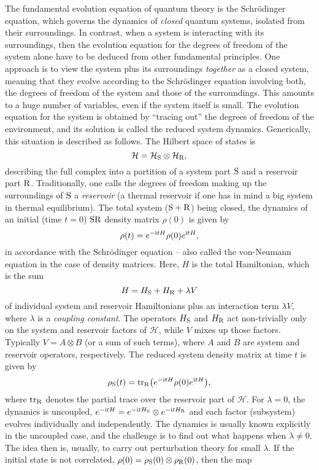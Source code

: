 \documentclass[letterpaper,onecolumn,11pt,accepted=2021-12-09]{quantumarticle}
\numberwithin{equation}{section}
\renewcommand{\r}{{\rm R}}
\newcommand{\s}{{\rm S}}
\renewcommand{\i}{{\rm i}}
\begin{document}
The fundamental evolution equation of quantum theory is the Schr\"odinger equation, which governs the dynamics of {\em closed} quantum systems,  isolated from their surroundings. In contrast, when a system is interacting with its surroundings, then the evolution equation for the degrees of freedom of the system alone have to be deduced from other fundamental principles. One approach is to view the system plus its surroundings {\em together} as a closed system, meaning that they evolve according to the Schr\"odinger equation involving both, the degrees of freedom of the system and those of the surroundings. This amounts to a huge number of variables, even if the system itself is small. The evolution equation for the system is obtained by ``tracing out'' the degrees of freedom of the environment, and its solution is called the reduced system dynamics. Generically, this situation is described as follows. The Hilbert space of states is 
\begin{equation}
\label{i4}
{\mathcal H}={\mathcal H}_\s\otimes{\mathcal H}_\r,
\end{equation}
describing the full complex into a partition of a system part $\s$ and a reservoir part $\r$. Traditionally, one calls the degrees of freedom making up the surroundings of $\s$ a {\em reservoir} (a thermal reservoir if one has in mind a big system in thermal equilibrium). The total system ($\s+\r$) being closed, the dynamics of an initial (time $t=0$) $\s\r$ density matrix $\rho(0)$ is given by 
$$
\rho(t) = e^{-\i t H}\rho(0) e^{\i t H},
$$
in accordance with the Schr\"odinger equation -- also called the von-Neumann equation in the case of density matrices. Here, $H$ is the total Hamiltonian, which is the sum 
\begin{equation}
\label{i5}
H= H_\s+ H_\r+ \lambda V
\end{equation}
of individual system and reservoir Hamiltonians plus an interaction term $\lambda V$, where $\lambda$ is a {\em coupling constant}. The operators $H_\s$ and $H_\r$ act non-trivially only on the system and reservoir factors of $\mathcal H$, while $V$ mixes up those factors. Typically $V=A\otimes B$ (or a sum of such terms), where $A$ and $B$ are system and reservoir operators, respectively. The reduced system density matrix at time $t$ is given by
\begin{equation}
\label{i0}
\rho_\s(t) = {\rm tr}_\r \big( e^{-\i t H}\rho(0)e^{\i t H}\big),
\end{equation}
where ${\rm tr}_\r$ denotes the partial trace over the reservoir part of $\mathcal H$. For $\lambda=0$, the dynamics is uncoupled, $e^{-\i t H}=e^{-\i t H_\s}\otimes e^{-\i t H_\r}$ and each factor (subsystem) evolves individually and independently. The dynamics is usually known explicitly in the uncoupled case, and the challenge is to find out what happens when $\lambda\neq 0$. The idea then is, usually, to carry out perturbation theory for small $\lambda$. If the initial state is not correlated, $\rho(0)=\rho_\s(0)\otimes\rho_\r(0)$, then the map
\end{document}
